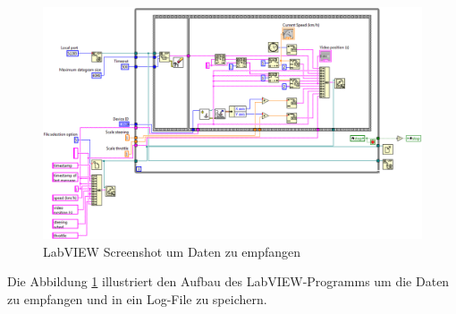 \begin{figure}[H]
\centering 
\includegraphics[width=1\linewidth]{src/labview_screenshot_videoplayer_daten_empfangen.png}
\caption{LabVIEW Screenshot um Daten zu empfangen} %
\label{labview_screenshot_videoplayer_daten_empfangen} %
\end{figure}
Die Abbildung \ref{labview_screenshot_videoplayer_daten_empfangen} illustriert den Aufbau des LabVIEW-Programms um die Daten zu empfangen und in ein Log-File zu speichern.\\
